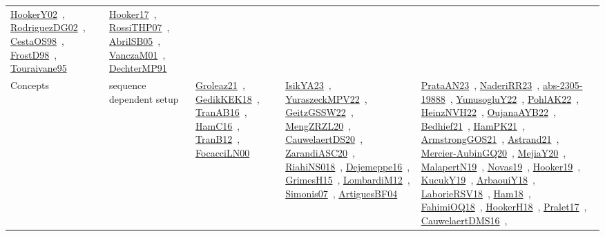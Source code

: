 {\begin{longtable}{lp{3cm}>{\raggedright\arraybackslash}p{6cm}>{\raggedright\arraybackslash}p{6cm}>{\raggedright\arraybackslash}p{8cm}}
\href{works/HookerY02.pdf}{HookerY02}~\cite{HookerY02}, \href{works/RodriguezDG02.pdf}{RodriguezDG02}~\cite{RodriguezDG02}, \href{works/CestaOS98.pdf}{CestaOS98}~\cite{CestaOS98}, \href{works/FrostD98.pdf}{FrostD98}~\cite{FrostD98}, \href{works/Touraivane95.pdf}{Touraivane95}~\cite{Touraivane95} & \href{works/Hooker17.pdf}{Hooker17}~\cite{Hooker17}, \href{works/RossiTHP07.pdf}{RossiTHP07}~\cite{RossiTHP07}, \href{works/AbrilSB05.pdf}{AbrilSB05}~\cite{AbrilSB05}, \href{works/VanczaM01.pdf}{VanczaM01}~\cite{VanczaM01}, \href{works/DechterMP91.pdf}{DechterMP91}~\cite{DechterMP91}\\
Concepts & sequence dependent setup & \href{works/Groleaz21.pdf}{Groleaz21}~\cite{Groleaz21}, \href{works/GedikKEK18.pdf}{GedikKEK18}~\cite{GedikKEK18}, \href{works/TranAB16.pdf}{TranAB16}~\cite{TranAB16}, \href{works/HamC16.pdf}{HamC16}~\cite{HamC16}, \href{works/TranB12.pdf}{TranB12}~\cite{TranB12}, \href{works/FocacciLN00.pdf}{FocacciLN00}~\cite{FocacciLN00} & \href{works/IsikYA23.pdf}{IsikYA23}~\cite{IsikYA23}, \href{works/YuraszeckMPV22.pdf}{YuraszeckMPV22}~\cite{YuraszeckMPV22}, \href{works/GeitzGSSW22.pdf}{GeitzGSSW22}~\cite{GeitzGSSW22}, \href{works/MengZRZL20.pdf}{MengZRZL20}~\cite{MengZRZL20}, \href{works/CauwelaertDS20.pdf}{CauwelaertDS20}~\cite{CauwelaertDS20}, \href{works/ZarandiASC20.pdf}{ZarandiASC20}~\cite{ZarandiASC20}, \href{works/RiahiNS018.pdf}{RiahiNS018}~\cite{RiahiNS018}, \href{works/Dejemeppe16.pdf}{Dejemeppe16}~\cite{Dejemeppe16}, \href{works/GrimesH15.pdf}{GrimesH15}~\cite{GrimesH15}, \href{works/LombardiM12.pdf}{LombardiM12}~\cite{LombardiM12}, \href{works/Simonis07.pdf}{Simonis07}~\cite{Simonis07}, \href{works/ArtiguesBF04.pdf}{ArtiguesBF04}~\cite{ArtiguesBF04} & \href{works/PrataAN23.pdf}{PrataAN23}~\cite{PrataAN23}, \href{works/NaderiRR23.pdf}{NaderiRR23}~\cite{NaderiRR23}, \href{works/abs-2305-19888.pdf}{abs-2305-19888}~\cite{abs-2305-19888}, \href{works/YunusogluY22.pdf}{YunusogluY22}~\cite{YunusogluY22}, \href{works/PohlAK22.pdf}{PohlAK22}~\cite{PohlAK22}, \href{works/HeinzNVH22.pdf}{HeinzNVH22}~\cite{HeinzNVH22}, \href{works/OujanaAYB22.pdf}{OujanaAYB22}~\cite{OujanaAYB22}, \href{works/Bedhief21.pdf}{Bedhief21}~\cite{Bedhief21}, \href{works/HamPK21.pdf}{HamPK21}~\cite{HamPK21}, \href{works/ArmstrongGOS21.pdf}{ArmstrongGOS21}~\cite{ArmstrongGOS21}, \href{works/Astrand21.pdf}{Astrand21}~\cite{Astrand21}, \href{works/Mercier-AubinGQ20.pdf}{Mercier-AubinGQ20}~\cite{Mercier-AubinGQ20}, \href{works/MejiaY20.pdf}{MejiaY20}~\cite{MejiaY20}, \href{works/MalapertN19.pdf}{MalapertN19}~\cite{MalapertN19}, \href{works/Novas19.pdf}{Novas19}~\cite{Novas19}, \href{works/Hooker19.pdf}{Hooker19}~\cite{Hooker19}, \href{works/KucukY19.pdf}{KucukY19}~\cite{KucukY19}, \href{works/ArbaouiY18.pdf}{ArbaouiY18}~\cite{ArbaouiY18}, \href{works/LaborieRSV18.pdf}{LaborieRSV18}~\cite{LaborieRSV18}, \href{works/Ham18.pdf}{Ham18}~\cite{Ham18}, \href{works/FahimiOQ18.pdf}{FahimiOQ18}~\cite{FahimiOQ18}, \href{works/HookerH18.pdf}{HookerH18}~\cite{HookerH18}, \href{works/Pralet17.pdf}{Pralet17}~\cite{Pralet17}, \href{works/CauwelaertDMS16.pdf}{CauwelaertDMS16}~\cite{CauwelaertDMS16}, 
\end{longtable}}
